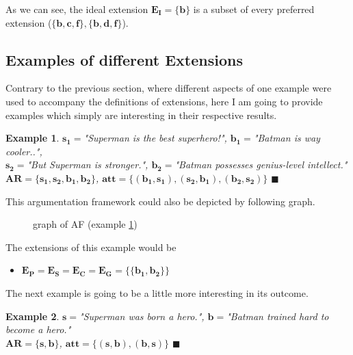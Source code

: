 \documentclass[12pt]{report}
\numberwithin{figure}{chapter}
\theoremstyle{break}
\newtheorem{exmpl}{Example}[chapter]
\newenvironment{myexmpl}{\begin{exmpl}}{$\blacksquare$ \end{exmpl}}
\begin{document}
As we can see, the ideal extension $\bm{E_{I}=\{b\}}$ is a subset of every preferred extension ($\bm{\{b,c,f\},\{b,d,f\}}$).

\newpage

\subsection{Examples of different Extensions}
Contrary to the previous section, where different aspects of one example were used to accompany the definitions of extensions, 
here I am going to provide examples which simply are interesting in their respective results.

\begin{myexmpl}
$\bm{s_{1}=}$"Superman is the best superhero!", $\bm{b_{1}=}$"Batman is way cooler..",\\
$\bm{s_{2}=}$"But Superman is stronger.", $\bm{b_{2}=}$"Batman possesses genius-level intellect."\\
$\bm{AR = \{s_{1},s_{2},b_{1},b_{2}\}}$, $\bm{att = \{(b_{1},s_{1}),(s_{2},b_{1}),(b_{2},s_{2})\}}$
\label{s1 s2 b1 b2 ex}
\end{myexmpl}

This argumentation framework could also be depicted by following graph.

\begin{figure}[h!]
\begin{center}\end{center}
\caption{graph of AF (example \ref{s1 s2 b1 b2 ex})}
\end{figure}

The extensions of this example would be 
\begin{itemize}
	\item{$\bm{E_{P}=E_{S}=E_{C}=E_{G}=\{\{b_{1},b_{2}\}\}}$}
\end{itemize}

The next example is going to be a little more interesting in its outcome.
\begin{myexmpl}
$\bm{s=}$"Superman was born a hero.", $\bm{b=}$"Batman trained hard to become a hero."\\
$\bm{AR=\{s,b\}}$, $\bm{att=\{(s,b),(b,s)\}}$
\label{s b ex}
\end{myexmpl}
\end{document}
